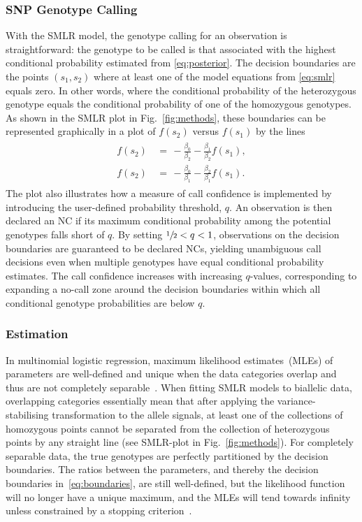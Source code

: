 \documentclass[preprint,5p,times,11pt]{elsarticle}
\begin{document}
\subsubsection{SNP Genotype Calling}
With the SMLR model, the genotype calling for an observation is straightforward: the genotype to be called is that associated with the highest conditional probability estimated from \eqref{eq:posterior}.
The decision boundaries are the points $(s_1, s_2)$ where at least one of the model equations from \eqref{eq:smlr} equals zero.
In other words, where the conditional probability of the heterozygous genotype equals the conditional probability of one of the homozygous genotypes.
As shown in the SMLR plot in Fig.~\ref{fig:methods}, these boundaries can be represented graphically in a plot of $f(s_2)$ versus $f(s_1)$ by the lines
\begin{align}\label{eq:boundaries}
\begin{split}
f(s_2) \, &= \, -\frac{\beta_0}{\beta_2} - \frac{\beta_1}{\beta_2} f(s_1), \\
f(s_2) \, &= \, -\frac{\beta_0}{\beta_1} - \frac{\beta_2}{\beta_1} f(s_1).
\end{split}
\end{align}
The plot also illustrates how a measure of call confidence is implemented by introducing the user-defined probability threshold, $q$.
An observation is then declared an NC if its maximum conditional probability among the potential genotypes falls short of $q$.
By setting $\sfrac{1}{2} < q < 1$, observations on the decision boundaries are guaranteed to be declared NCs, yielding unambiguous call decisions even when multiple genotypes have equal conditional probability estimates.
The call confidence increases with increasing $q$-values, corresponding to expanding a no-call zone around the decision boundaries within which all conditional genotype probabilities are below $q$.


\subsubsection{Estimation}
In multinomial logistic regression, maximum likelihood estimates~(MLEs) of parameters are well-defined and unique when the data categories overlap and thus are not completely separable~\cite{albert, lesaffre}.
When fitting SMLR models to biallelic data, overlapping categories essentially mean that after applying the variance-stabilising transformation to the allele signals, at least one of the collections of homozygous points cannot be separated from the collection of heterozygous points by any straight line (see SMLR-plot in Fig.~\ref{fig:methods}).
For completely separable data, the true genotypes are perfectly partitioned by the decision boundaries.
The ratios between the parameters, and thereby the decision boundaries in~\eqref{eq:boundaries}, are still well-defined, but the likelihood function will no longer have a unique maximum, and the MLEs will tend towards infinity unless constrained by a stopping criterion~\cite[p.~298]{agresti}.
\end{document}
